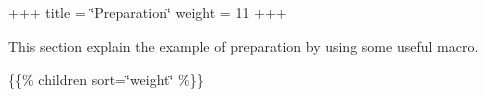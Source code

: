 +++ title = \char`\"{}\+Preparation\char`\"{} weight = 11 +++

This section explain the example of preparation by using some useful macro.

\{\{\% children sort=\char`\"{}weight\char`\"{} \%\}\} 